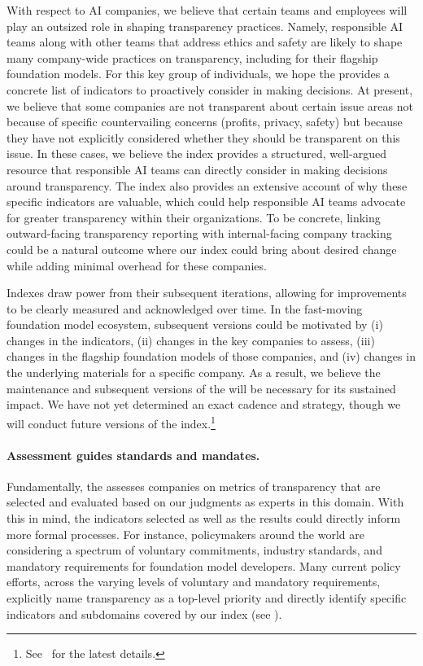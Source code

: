 With respect to AI companies, we believe that certain teams and employees will play an outsized role in shaping transparency practices.
Namely, responsible AI teams along with other teams that address ethics and safety are likely to shape many company-wide practices on transparency, including for their flagship foundation models.
For this key group of individuals, we hope the \projectname provides a concrete list of indicators to proactively consider in making decisions.
At present, we believe that some companies are not transparent about certain issue areas not because of specific countervailing concerns (\eg profits, privacy, safety) but because they have not explicitly considered whether they should be transparent on this issue. 
In these cases, we believe the index provides a structured, well-argued resource that responsible AI teams can directly consider in making decisions around transparency.
The index also provides an extensive account of why these specific indicators are valuable, which could help responsible AI teams advocate for greater transparency within their organizations.
To be concrete, linking outward-facing transparency reporting with internal-facing company tracking could be a natural outcome where our index could bring about desired change while adding minimal overhead for these companies.

Indexes draw power from their subsequent iterations, allowing for improvements to be clearly measured and acknowledged over time.
In the fast-moving foundation model ecosystem, subsequent versions could be motivated by (i) changes in the indicators, (ii) changes in the key companies to assess, (iii) changes in the flagship foundation models of those companies, and (iv) changes in the underlying materials for a specific company. 
As a result, we believe the maintenance and subsequent versions of the \projectname will be necessary for its sustained impact.
We have not yet determined an exact cadence and strategy, though we will conduct future versions of the index.\footnote{See \indexUrl~for the latest details.} 

\paragraph{Assessment guides standards and mandates.}
Fundamentally, the \projectname assesses companies on metrics of transparency that are selected and evaluated based on our judgments as experts in this domain.
With this in mind, the indicators selected as well as the results could directly inform more formal processes.
For instance, policymakers around the world are considering a spectrum of voluntary commitments, industry standards, and mandatory requirements for foundation model developers.
Many current policy efforts, across the varying levels of voluntary and mandatory requirements, explicitly name transparency as a top-level priority and directly identify specific indicators and subdomains covered by our index (see ).

